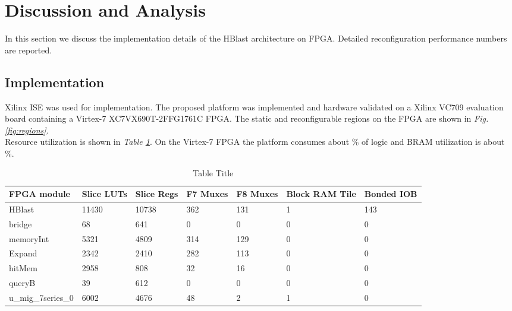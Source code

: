 \section{Discussion and Analysis}
\label{sec:discussion}

\quad In this section we discuss the implementation details of the HBlast architecture on FPGA. Detailed reconfiguration performance numbers are reported. 

\subsection{Implementation}
\quad Xilinx ISE was used for implementation. The proposed platform was implemented and hardware validated on a Xilinx VC709 evaluation board containing a Virtex-7 XC7VX690T-2FFG1761C FPGA. The static and reconfigurable regions on the FPGA are shown in \textit{Fig.\ref{fig:regions}}. 
\\

Resource utilization is shown in \textit{Table \ref{tab:title}}. On the Virtex-7 FPGA the platform consumes about \% of logic and BRAM utilization is about \%.

\begin{table}[]
\caption {Table Title} \label{tab:title}
\begin{tabular}{|l|l|l|l|l|l|l|}
\hline
FPGA module        & Slice LUTs & Slice Regs & F7 Muxes & F8 Muxes & Block RAM Tile & Bonded IOB \\ \hline
HBlast             & 11430      & 10738      & 362      & 131      & 1              & 143        \\
bridge             & 68         & 641        & 0        & 0        & 0              & 0          \\
memoryInt          & 5321       & 4809       & 314      & 129      & 0              & 0          \\
Expand             & 2342       & 2410       & 282      & 113      & 0              & 0          \\
hitMem             & 2958       & 808        & 32       & 16       & 0              & 0          \\
queryB             & 39         & 612        & 0        & 0        & 0              & 0          \\
u\_mig\_7series\_0 & 6002       & 4676       & 48       & 2        & 1              & 0          \\ \hline

\end{tabular}
\end{table}


